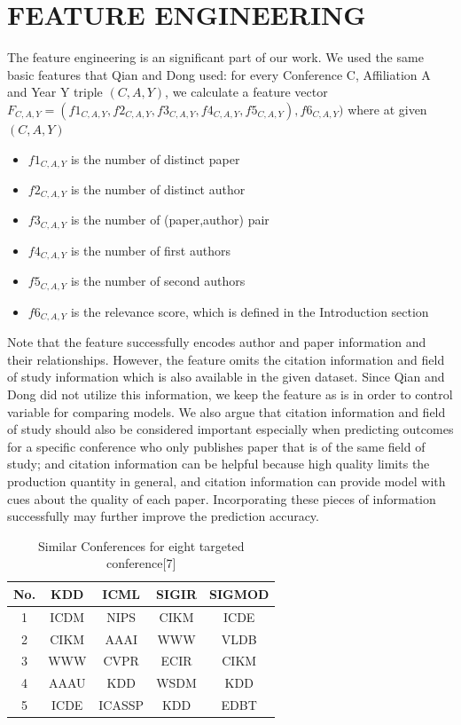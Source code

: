 \documentclass[letterpaper]{article}
\begin{document}
\section{FEATURE ENGINEERING}
The feature engineering is an significant part of our work. We used the same basic features that Qian and Dong used: for every Conference C, Affiliation A and Year Y triple $(C,A,Y)$, we calculate a feature vector $F_{C,A,Y} = (f1_{C,A,Y}, f2_{C,A,Y}, f3_{C,A,Y}, f4_{C,A,Y}, f5_{C,A,Y}),f6_{C,A,Y})$ where at given $(C,A,Y)$
\begin{itemize}
    \item $f1_{C,A,Y}$ is the number of distinct paper
    \item $f2_{C,A,Y}$ is the number of distinct author
    \item $f3_{C,A,Y}$ is the number of (paper,author) pair
    \item $f4_{C,A,Y}$ is the number of first authors 
    \item $f5_{C,A,Y}$ is the number of second authors
    \item $f6_{C,A,Y}$ is the relevance score, which is defined in the Introduction section
\end{itemize}
Note that the feature successfully encodes author and paper information and their relationships. However, the feature omits the citation information and field of study information which is also available in the given dataset. Since Qian and Dong did not utilize this information, we keep the feature as is in order to control variable for comparing models. We also argue that citation information and field of study should also be considered important especially when predicting outcomes for a specific conference who only publishes paper that is of the same field of study; and citation information can be helpful because high quality limits the production quantity in general, and citation information can provide model with cues about the quality of each paper. Incorporating these pieces of information successfully may further improve the prediction accuracy.
\begin{table}[h]
    \centering
    \caption{Similar Conferences for eight targeted conference[7]\newline}
    \begin{tabular}{c|c|c|c|c}
        \hline
        No.& KDD & ICML & SIGIR & SIGMOD\\
        \hline
        1 & ICDM & NIPS & CIKM & ICDE \\
        2 & CIKM & AAAI & WWW & VLDB\\
        3 & WWW & CVPR & ECIR & CIKM\\
        4 & AAAU & KDD & WSDM & KDD\\
        5 & ICDE & ICASSP & KDD & EDBT\\
        \hline
    \end{tabular}
\end{table}
\end{document}
